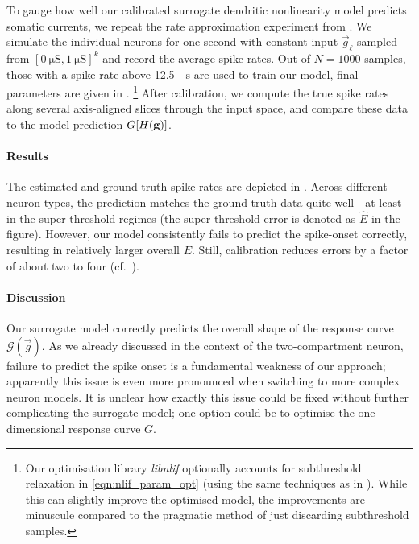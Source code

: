 To gauge how well our calibrated surrogate dendritic nonlinearity model predicts somatic currents, we repeat the rate approximation experiment from .
We simulate the individual neurons for one second with constant input $\vec g_\ell$ sampled from $[\SI{0}{\micro\siemens}, \SI{1}{\micro\siemens}]^k$ and record the average spike rates.
Out of $N = 1000$ samples, those with a spike rate above \SI{12.5}{\per\second} are used to train our model, final parameters are given in .%
\footnote{
Our optimisation library \emph{libnlif} optionally accounts for subthreshold relaxation in \cref{eqn:nlif_param_opt} (using the same techniques as in ).
While this can slightly improve the optimised model, the improvements are minuscule compared to the pragmatic method of just discarding subthreshold samples.
}
After calibration, we compute the true spike rates along several axis-aligned slices through the input space, and compare these data to the model prediction $G[{H}(\mathbf{g})]$.

\paragraph{Results}
The estimated and ground-truth spike rates are depicted in .
Across different neuron types, the prediction matches the ground-truth data quite well---at least in the super-threshold regimes (the super-threshold error is denoted as $\hat E$ in the figure).
However, our model consistently fails to predict the spike-onset correctly, resulting in relatively larger overall \RMSEpl $E$.
Still, calibration reduces errors by a factor of about two to four (cf.~).

\paragraph{Discussion}
Our surrogate model correctly predicts the overall shape of the response curve $\mathscr{G}(\vec g)$.
As we already discussed in the context of the two-compartment neuron, failure to predict the spike onset is a fundamental weakness of our approach; apparently this issue is even more pronounced when switching to more complex neuron models.
It is unclear how exactly this issue could be fixed without further complicating the surrogate model; one option could be to optimise the one-dimensional response curve $G$.


